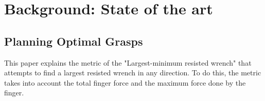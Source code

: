
\chapter{Background: State of the art}
\label{chapter:evaluation}
\section{Planning Optimal Grasps \cite{ferrari1992planning}}

This paper explains the metric of the "Largest-minimum resisted wrench" that attempts to find a largest resisted wrench in any direction. To do this, the metric takes into account the total finger force and the maximum force done by the finger.